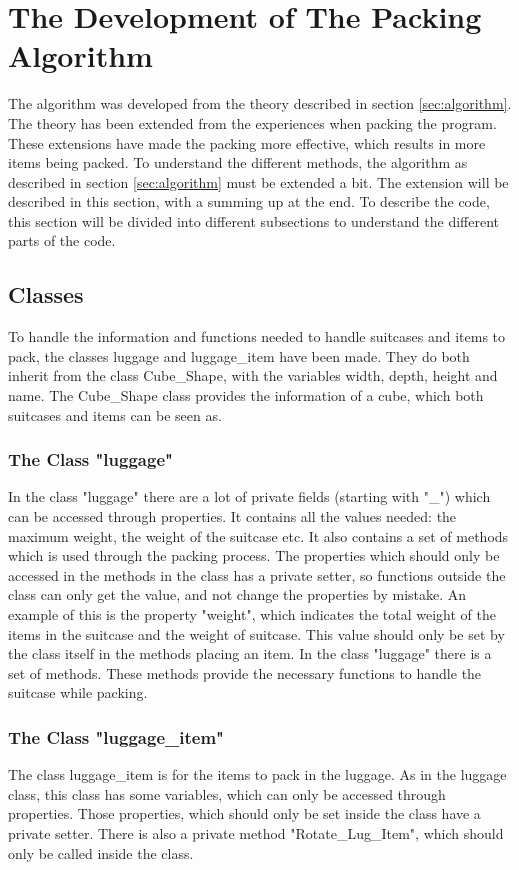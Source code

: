 \section{The Development of The Packing Algorithm}
\label{sec:devalgorithm}
The algorithm was developed from the theory described in section \ref{sec:algorithm}. The theory has been extended from the experiences when packing the program. These extensions have made the packing more effective, which results in more items being packed. 
To understand the different methods, the algorithm as described in section \ref{sec:algorithm} must be extended a bit. The extension will be described in this section, with a summing up at the end. To describe the code, this section will be divided into different subsections to understand the different parts of the code.

\subsection{Classes}
To handle the information and functions needed to handle suitcases and items to pack, the classes luggage and luggage\_item have been made. They do both inherit from the class Cube\_Shape, with the variables width, depth, height and name. The Cube\_Shape class provides the information of a cube, which both suitcases and items can be seen as.

\subsubsection{The Class "luggage"}
In the class "luggage" there are a lot of private fields (starting with "\_") which can be accessed through properties. It contains all the values needed: the maximum weight, the weight of the suitcase etc. It also contains a set of methods which is used through the packing process. The properties which should only be accessed in the methods in the class has a private setter, so functions outside the class can only get the value, and not change the properties by mistake. An example of this is the property "weight", which indicates the total weight of the items in the suitcase and the weight of suitcase. This value should only be set by the class itself in the methods placing an item.
In the class "luggage" there is a set of methods. These methods provide the necessary functions to handle the suitcase while packing.

\subsubsection{The Class "luggage\_item"}
The class luggage\_item is for the items to pack in the luggage. As in the luggage class, this class has some variables, which can only be accessed through properties. Those properties, which should only be set inside the class have a private setter. There is also a private method "Rotate\_Lug\_Item", which should only be called inside the class.

